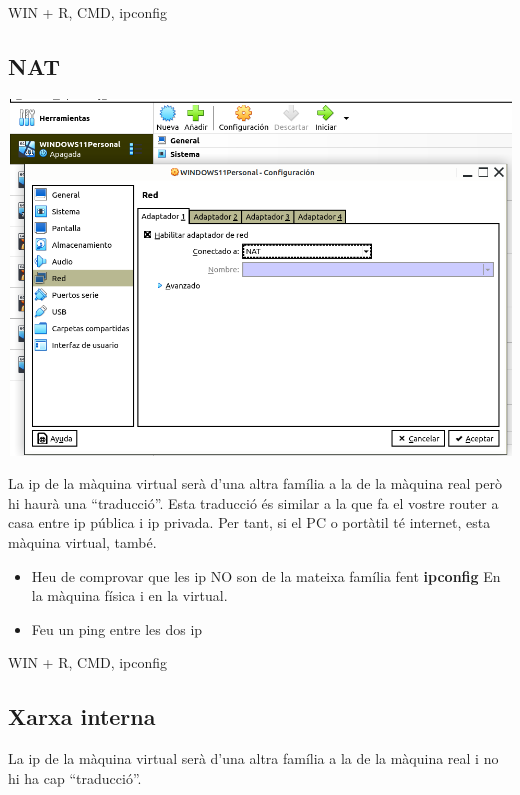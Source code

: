 \documentclass[
  12 pt,
  a4paper,
]{article}
\providecommand{\tightlist}{%
  \setlength{\itemsep}{0pt}\setlength{\parskip}{0pt}}
\begin{document}
WIN + R, CMD, ipconfig

\subsection{NAT}\label{nat}

\includegraphics{png/NAT.png}

La ip de la màquina virtual serà d'una altra família a la de la màquina
real però hi haurà una ``traducció''. Esta traducció és similar a la que
fa el vostre router a casa entre ip pública i ip privada. Per tant, si
el PC o portàtil té internet, esta màquina virtual, també.

\begin{itemize}
\tightlist
\item
  Heu de comprovar que les ip NO son de la mateixa família fent
  \textbf{ipconfig} En la màquina física i en la virtual.
\item
  Feu un ping entre les dos ip
\end{itemize}

WIN + R, CMD, ipconfig

\subsection{Xarxa interna}\label{xarxa-interna}

La ip de la màquina virtual serà d'una altra família a la de la màquina
real i no hi ha cap ``traducció''.
\end{document}
